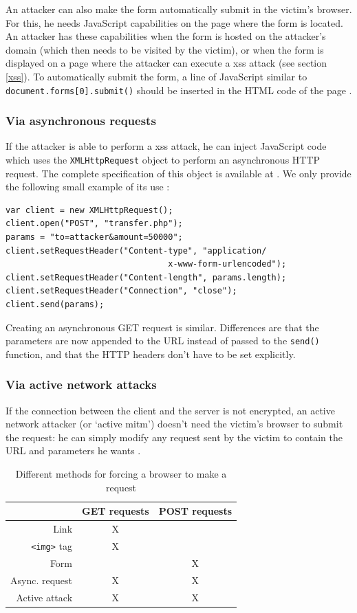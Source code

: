 An attacker can also make the form automatically submit in the victim's browser. For this, he needs JavaScript capabilities on the page where the form is located. An attacker has these capabilities when the form is hosted on the attacker's domain (which then needs to be visited by the victim), or when the form is displayed on a page where the attacker can execute a \gls{xss} attack (see section \ref{xss}). To automatically submit the form, a line of JavaScript similar to \texttt{document.forms[0].submit()} should be inserted in the HTML code of the page \cite{Jovanovic2006}.

\subsubsection{Via asynchronous requests}

If the attacker is able to perform a \gls{xss} attack, he can inject JavaScript code which uses the \texttt{XMLHttpRequest} object to perform an asynchronous HTTP request. The complete specification of this object is available at \cite{Kesteren:09:X}. We only provide the following small example of its use \cite{Binny2010}:
\begin{lstlisting}
var client = new XMLHttpRequest();
client.open("POST", "transfer.php");
params = "to=attacker&amount=50000";
client.setRequestHeader("Content-type", "application/
                                 x-www-form-urlencoded");
client.setRequestHeader("Content-length", params.length);
client.setRequestHeader("Connection", "close");
client.send(params);
\end{lstlisting}
Creating an asynchronous GET request is similar. Differences are that the parameters are now appended to the URL instead of passed to the \texttt{send()} function, and that the HTTP headers don't have to be set explicitly.

\subsubsection{Via active network attacks}

If the connection between the client and the server is not encrypted, an active network attacker (or `active \gls{mitm}') doesn't need the victim's browser to submit the request: he can simply modify any request sent by the victim to contain the URL and parameters he wants \cite{Barth2008}.

\begin{table}[ht]
	\centering
	\begin{tabular}{r|cc}
		& GET requests & POST requests\\
		\hline
		Link & X & \\
		\texttt{<img>} tag & X & \\
		Form &  & X \\
		Async. request & X & X \\
		Active attack & X & X \\
	\end{tabular}
	\caption{Different methods for forcing a browser to make a request}
	\label{tab:forcing-request}
\end{table}

